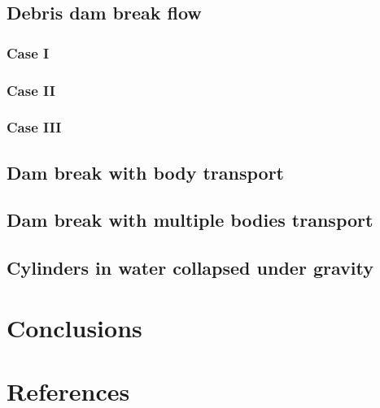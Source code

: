 \documentclass[preprint,12pt]{elsarticle}
\begin{document}
\subsection{Debris dam break flow}
\label{sec:debris-dam-break-canelas}

\subsubsection{Case I}
\label{sec:debris-dam-break-canelas-case-I}

\subsubsection{Case II}
\label{sec:debris-dam-break-canelas-case-II}


\subsubsection{Case III}
\label{sec:debris-dam-break-canelas-case-III}


\subsection{Dam break with body transport}
\label{sec:dam-break-with-body-transport}

\citet{wang2019numerical}

\subsection{Dam break with multiple bodies transport}
\label{sec:dam-break-with-multiple-bodies-transport}
\citet{wang2019numerical}


\subsection{Cylinders in water collapsed under gravity}
\label{sec:cylinders-collapse-in-water}
\citet{chen2019coupled}


\section{Conclusions}
\label{sec:conclusions}

\section*{References}


\end{document}
